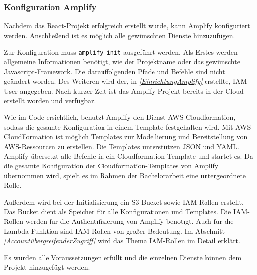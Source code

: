 \subsubsection{Konfiguration Amplify}

Nachdem das React-Projekt erfolgreich erstellt wurde, kann Amplify konfiguriert werden.
Anschließend ist es möglich alle gewünschten Dienste hinzuzufügen.

Zur Konfiguration muss \verb+amplify init+ ausgeführt werden.
Als Erstes werden allgemeine Informationen benötigt, wie der Projektname oder das gewünschte Javascript-Framework.
Die darauffolgenden Pfade und Befehle sind nicht geändert worden.
Des Weiteren wird der, in \textit{\ref{EinrichtungAmplify} } erstellte, IAM-User angegeben.
Nach kurzer Zeit ist das Amplify Projekt bereits in der Cloud erstellt worden und verfügbar.

Wie im Code ersichtlich, benutzt Amplify den Dienst AWS Cloudformation, sodass die gesamte Konfiguration in einem Template festgehalten wird.
Mit AWS CloudFormation ist möglich Templates zur Modellierung und Bereitstellung von AWS-Ressourcen zu erstellen.
Die Templates unterstützen JSON und YAML.
Amplify übersetzt alle Befehle in ein Cloudformation Template und startet es.
Da die gesamte Konfiguration der Cloudformation-Templates von Amplify übernommen wird, spielt es im Rahmen der Bachelorarbeit eine untergeordnete Rolle.

Außerdem wird bei der Initialisierung ein S3 Bucket sowie IAM-Rollen erstellt.
Das Bucket dient als Speicher für alle Konfigurationen und Templates.
Die IAM-Rollen werden für die Authentifizierung von Amplify benötigt.
Auch für die Lambda-Funktion sind IAM-Rollen von großer Bedeutung.
Im Abschnitt \textit{\ref{AccountübergreifenderZugriff} } wird das Thema IAM-Rollen im Detail erklärt.

Es wurden alle Voraussetzungen erfüllt und die einzelnen Dienste können dem Projekt hinzugefügt werden.

\clearpage

